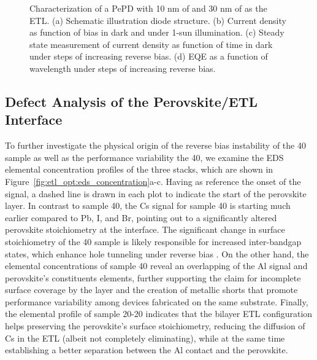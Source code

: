 \begin{figure}[t]
\begin{subfigure}[t]{0.4\textwidth}
        \caption{}
        \label{}
    \end{subfigure}
    \caption{Characterization of a PePD with 10 nm of  and 30 nm of  as the ETL. (a) Schematic illustration diode structure. (b) Current density as function of bias in dark and under 1-sun illumination. (c) Steady state measurement of current density as function of time in dark under steps of increasing reverse bias. (d) EQE as a function of wavelength under steps of increasing reverse bias.}
    \label{fig:etl_opt:10nmC60_30nmTiO2}
\end{figure}

\subsection{Defect Analysis of the Perovskite/ETL Interface}


To further investigate the physical origin of the reverse bias instability of the 40 sample as well as the performance variability the 40, we examine the EDS elemental concentration profiles of the three stacks, which are shown in Figure~\ref{fig:etl_opt:eds_concentration}a-c. Having as reference the onset of the  signal, a dashed line is drawn in each plot to indicate the start of the perovskite layer. In contrast to sample 40, the Cs signal for sample 40 is starting much earlier compared to Pb, I, and Br, pointing out to a significantly altered perovskite stoichiometry at the interface. The significant change in surface stoichiometry of the 40 sample is likely responsible for increased inter-bandgap states, which enhance hole tunneling under reverse bias \cite{Huang2018IntrinsicCsPbI3, Kang2017HighCsPbBr3, Chu2020SoftDefects}. On the other hand, the elemental concentrations of sample 40 reveal an overlapping of the Al signal and perovskite's constituents elements, further supporting the claim for incomplete surface coverage by the  layer and the creation of metallic shorts that promote performance variability among devices fabricated on the same substrate. Finally, the elemental profile of sample 20-20 indicates that the bilayer ETL configuration helps preserving the perovskite's surface stoichiometry, reducing the diffusion of Cs in the ETL (albeit not completely eliminating), while at the same time establishing a better separation between the Al contact and the perovskite. 



